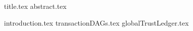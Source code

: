 \documentclass[11pt]{llncs}
\begin{document}
{title.tex}
\thispagestyle{plain}
{abstract.tex}

{introduction.tex}
{transactionDAGs.tex}
{globalTrustLedger.tex}

\end{document}
